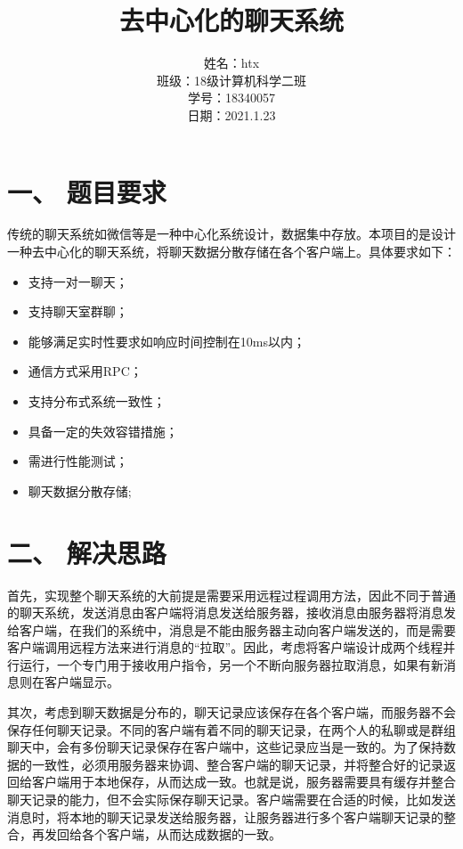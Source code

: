 \documentclass{report}
\begin{document}
\title{去中心化的聊天系统}
\date{}
\author{姓名：htx\\班级：18级计算机科学二班\\学号：18340057\\日期：2021.1.23}
\maketitle

\section*{一、 题目要求}
传统的聊天系统如微信等是一种中心化系统设计，数据集中存放。本项目的是设计一种去中心化的聊天系统，将聊天数据分散存储在各个客户端上。具体要求如下：
\begin{itemize}
\item 支持一对一聊天；
\item 支持聊天室群聊；
\item 能够满足实时性要求如响应时间控制在10ms以内；
\item 通信方式采用RPC；
\item 支持分布式系统一致性；
\item 具备一定的失效容错措施；
\item 需进行性能测试；
\item 聊天数据分散存储;
\end{itemize}


\section*{二、 解决思路}
首先，实现整个聊天系统的大前提是需要采用远程过程调用方法，因此不同于普通的聊天系统，发送消息由客户端将消息发送给服务器，接收消息由服务器将消息发给客户端，在我们的系统中，消息是不能由服务器主动向客户端发送的，而是需要客户端调用远程方法来进行消息的“拉取”。因此，考虑将客户端设计成两个线程并行运行，一个专门用于接收用户指令，另一个不断向服务器拉取消息，如果有新消息则在客户端显示。

其次，考虑到聊天数据是分布的，聊天记录应该保存在各个客户端，而服务器不会保存任何聊天记录。不同的客户端有着不同的聊天记录，在两个人的私聊或是群组聊天中，会有多份聊天记录保存在客户端中，这些记录应当是一致的。为了保持数据的一致性，必须用服务器来协调、整合客户端的聊天记录，并将整合好的记录返回给客户端用于本地保存，从而达成一致。也就是说，服务器需要具有缓存并整合聊天记录的能力，但不会实际保存聊天记录。客户端需要在合适的时候，比如发送消息时，将本地的聊天记录发送给服务器，让服务器进行多个客户端聊天记录的整合，再发回给各个客户端，从而达成数据的一致。
\end{document}
